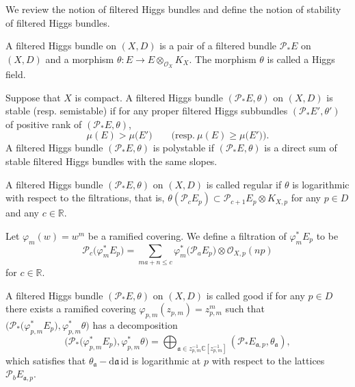 \documentclass[10pt,a4paper]{amsart}
\numberwithin{equation}{section}
\newcommand{\R}{\mathbb{R}}
\newcommand{\id}{\mathrm{id}}
\newcommand{\strsheaf}{\mathcal{O}}
\begin{document}
We review the notion of filtered Higgs bundles and define the notion of stability of filtered Higgs bundles.
\begin{Definition}
 A filtered Higgs bundle on $(X,D)$ is a pair of a filtered bundle $\mathcal{P}_{*} E$ on $(X,D)$ and a morphism $\theta\colon E\to E\otimes_{\strsheaf_{X}} K_{X}$. The morphism $\theta$ is called a Higgs field.
\end{Definition}

\begin{Definition}
 Suppose that $X$ is compact.
 A filtered Higgs bundle $(\mathcal{P}_{*} E,\theta)$ on $(X,D)$ is stable (resp. semistable) if for any
 proper filtered Higgs subbundles $(\mathcal{P}_{*} E',\theta')$ of positive rank of $(\mathcal{P}_{*} E,\theta)$,
 \begin{equation*}
 \mu(E) > \mu\bigl(E'\bigr)\qquad \bigl(\text{resp.}\ \mu(E) \geq \mu\bigl(E'\bigr)\bigr).
 \end{equation*}
 A filtered Higgs bundle $(\mathcal{P}_{*} E,\theta)$ is polystable if $(\mathcal{P}_{*} E,\theta)$ is a direct sum of stable filtered Higgs bundles with the same slopes.
\end{Definition}
\begin{Definition}
 A filtered Higgs bundle $(\mathcal{P}_{*} E,\theta)$ on $(X,D)$ is called regular if $\theta$ is logarithmic with respect to the filtrations, that is, $\theta(\mathcal{P}_{c} E_p)\subset \mathcal{P}_{c+1} E_p\otimes K_{X,p}$ for any $p\in D$ and any $c\in \R$.
\end{Definition}
Let $\varphi_m(w)=w^m$ be a ramified covering. We define a filtration of $\varphi_m ^{*}E_p$ to be
\begin{equation*}
 \mathcal{P}_{c}\bigl(\varphi_m ^{*} E_p\bigr) = \sum_{ma+n\leq c} \varphi_m ^{*}\bigl(\mathcal{P}_{a} E_p\bigr)\otimes \strsheaf_{X,p}(np)
\end{equation*}
for $c\in\R$.
\begin{Definition}
 A filtered Higgs bundle $(\mathcal{P}_{*} E,\theta)$ on $(X,D)$ is called good if for any $p\in D$ there exists a ramified covering $\varphi_{p,m}(z_{p,m})=z_{p,m}^m$ such that $\bigl(\mathcal{P}_{*}\bigl(\varphi_{p,m}^{*}E_p\bigr),\varphi_{p,m}^{*}\theta\bigr)$ has a decomposition
 \begin{equation*}
 \bigl(\mathcal{P}_{*}\bigl(\varphi_{p,m}^{*}E_p\bigr),\varphi_{p,m}^{*}\theta\bigr) = \bigoplus_{\mathfrak{a} \in z_{p,m}^{-1}\mathbb{C}[z_{p,m}^{-1}]} (\mathcal{P}_{*} E_{\mathfrak{a},p},\theta_{\mathfrak{a}}),
 \end{equation*}
 which satisfies that $\theta_{\mathfrak{a}} - \mathrm{d}\mathfrak{a}\, \id$ is logarithmic at $p$ with respect to the lattices $\mathcal{P}_{b}E_{\mathfrak{a},p}$.
\end{Definition}
\end{document}
